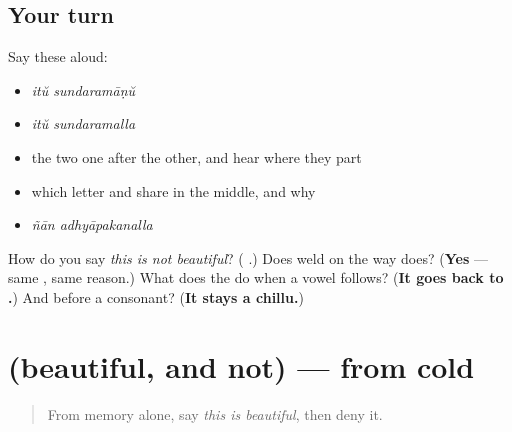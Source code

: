 \subsection*{Your turn}
Say these aloud:

\begin{itemize}
\raggedright
  \item \emph{itŭ sundaramāṇŭ}
  \item \emph{itŭ sundaramalla}
  \item the two one after the other, and hear where they part
  \item which letter \textbf{} and \textbf{} share in the middle, and why
  \item \emph{ñān adhyāpakanalla}
\end{itemize}

\begin{tcolorbox}[breakable,colback=teal!4,colframe=teal!35!black,title={Before you move on}]
How do you say \emph{this is not beautiful}? (\textbf{ }.) Does \textbf{} weld on the way \textbf{} does? (\textbf{Yes} — same \textbf{}, same reason.) What does the \textbf{} do when a vowel follows? (\textbf{It goes back to .}) And before a consonant? (\textbf{It stays a chillu.})
\end{tcolorbox}
\section[(beautiful, and not)]{(beautiful, and not) — from cold}

\label{lesson:ML-R97-beauty-recall}



\begin{quote}
From memory alone, say \emph{this is beautiful}, then deny it.
\end{quote}

